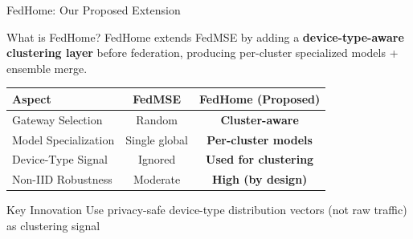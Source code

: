 \documentclass[10pt, aspectratio=169]{beamer}
\begin{document}
\begin{frame}{FedHome: Our Proposed Extension}
    \begin{block}{What is FedHome?}
        FedHome extends FedMSE by adding a \textbf{device-type-aware clustering layer} before federation, producing per-cluster specialized models + ensemble merge.
    \end{block}
    
    \vspace{0.5cm}
    
    \begin{table}
        \centering
        \footnotesize
        \begin{tabular}{@{}lcc@{}}
            \toprule
            \textbf{Aspect} & \textbf{FedMSE} & \textbf{FedHome (Proposed)} \\
            \midrule
            Gateway Selection & Random & \textbf{Cluster-aware} \\
            Model Specialization & Single global & \textbf{Per-cluster models} \\
            Device-Type Signal & Ignored & \textbf{Used for clustering} \\
            Non-IID Robustness & Moderate & \textbf{High (by design)} \\
            \bottomrule
        \end{tabular}
    \end{table}
    
    \vspace{0.5cm}
    
    \begin{alertblock}{Key Innovation}
        Use privacy-safe device-type distribution vectors (not raw traffic) as clustering signal
    \end{alertblock}
\end{frame}
\end{document}
